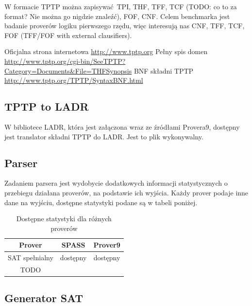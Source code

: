 \documentclass[a4paper,12pt]{article}
\begin{document}
W formacie TPTP można zapisywać \gls{TPI}, \gls{THF}, \gls{TFF}, TCF (TODO: co to za format? Nie można go nigdzie znaleźć), \gls{FOF}, \gls{CNF}. Celem benchmarka jest badanie proverów logiku pierwszego rzędu, więc interesują nas \gls{CNF}, \gls{TFF}, TCF, \gls{FOF} (TFF/FOF with external clausifiers).


\noindent
Oficjalna strona internetowa \url{http://www.tptp.org}
\newline
Pełny spis domen \url{http://www.tptp.org/cgi-bin/SeeTPTP?Category=Documents&File=THFSynopsis}
\newline
BNF składni TPTP \url{http://www.tptp.org/TPTP/SyntaxBNF.html}



\subsection{TPTP to LADR}

W bibliotece \gls{LADR}, która jest załączona wraz ze źródłami Provera9, dostępny jest translator składni TPTP do LADR. Jest to plik wykonywalny.

\subsection{Parser}

Zadaniem parsera jest wydobycie dodatkowych informacji statystycznych o przebiegu działana proverów, na podstawie ich wyjścia.
\newline
Każdy prover podaje inne dane na wyjściu, dostępne statystyki podane są w tabeli poniżej.

\begin{table}[ht]
  \centering
  \caption{Dostępne statystyki dla różnych proverów}
  \begin{tabular}{ |c|c|c| }
    \hline
    Prover & SPASS & Prover9 \\
    \hline
    SAT spełnialny & dostępny & dostępny \\
    \hline
    TODO & & \\
    \hline
  \end{tabular}
\end{table}


\subsection{Generator SAT}
\end{document}
